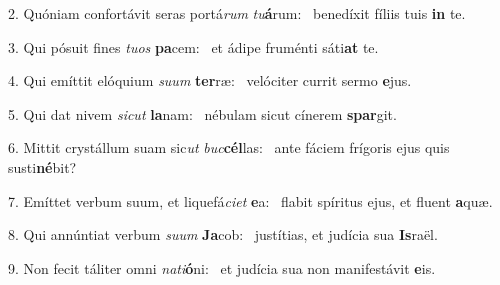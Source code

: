 2. Quóniam confortávit seras portá\textit{rum} \textit{tu}\textbf{á}rum: \ast\  benedíxit fíliis tuis \textbf{in} te.\

3. Qui pósuit fines \textit{tu}\textit{os} \textbf{pa}cem: \ast\  et ádipe fruménti sáti\textbf{at} te.\

4. Qui emíttit elóquium \textit{su}\textit{um} \textbf{ter}ræ: \ast\  velóciter currit sermo \textbf{e}jus.\

5. Qui dat nivem \textit{sic}\textit{ut} \textbf{la}nam: \ast\  nébulam sicut cínerem \textbf{spar}git.\

6. Mittit crystállum suam sic\textit{ut} \textit{buc}\textbf{cél}las: \ast\  ante fáciem frígoris ejus quis susti\textbf{né}bit?\

7. Emíttet verbum suum, et liquefá\textit{ci}\textit{et} \textbf{e}a: \ast\  flabit spíritus ejus, et fluent \textbf{a}quæ.\

8. Qui annúntiat verbum \textit{su}\textit{um} \textbf{Ja}cob: \ast\  justítias, et judícia sua \textbf{Is}raël.\

9. Non fecit táliter omni \textit{na}\textit{ti}\textbf{ó}ni: \ast\  et judícia sua non manifestávit \textbf{e}is.\

